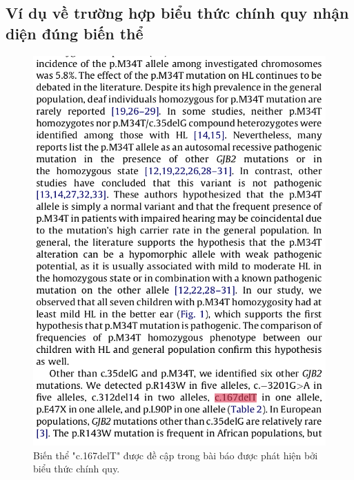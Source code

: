 \documentclass[../DoAn.tex]{subfiles}
\begin{document}
\subsection{Ví dụ về trường hợp biểu thức chính quy nhận diện đúng biến thể}
\begin{figure}
\centering
\includegraphics[width=1\linewidth]{Hinh_ve/PDFc167delTright.png}
\caption{Biến thể "c.167delT" được đề cập trong bài báo được phát hiện bởi biểu thức chính quy.}
\label{fig:PDFc167delTright}
\end{figure}
\end{document}
